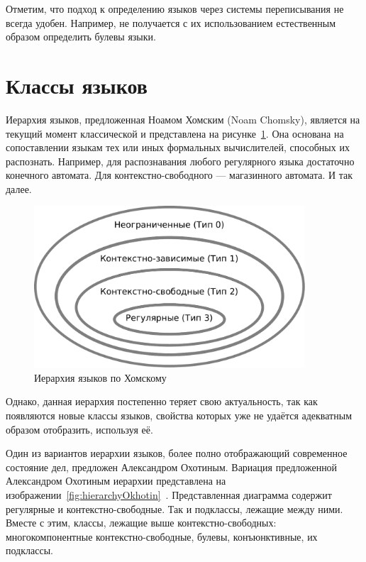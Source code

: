 Отметим, что подход к определению языков через системы переписывания не всегда удобен. Например, не получается с их использованием естественным образом определить булевы языки.


\section{Классы языков}

Иерархия языков, предложенная Ноамом Хомским (Noam Chomsky), является на текущий момент классической и представлена на рисунке~\ref{fig:Chomsky}.
Она основана на сопоставлении языкам тех или иных формальных вычислителей, способных их распознать.
Например, для распознавания любого регулярного языка достаточно конечного автомата. Для контекстно-свободного --- магазинного автомата. И так далее.


\begin{figure}
  \begin{center}
    \includegraphics[width=0.9\textwidth]{figures/Chomsky.pdf}
  \end{center}
  \caption{Иерархия языков по Хомскому}
  \label{fig:Chomsky}
\end{figure}

Однако, данная иерархия постепенно теряет свою актуальность, так как появляются новые классы языков, свойства которых уже не удаётся адекватным образом отобразить, используя её.

Один из вариантов иерархии языков, более полно отображающий современное состояние дел, предложен Александром Охотиным.
Вариация предложенной Александром Охотиным иерархии представлена на изображении~\ref{fig:hierarchyOkhotin}~.
Представленная диаграмма содержит регулярные и контекстно-свободные.
Так и подклассы, лежащие между ними.
Вместе с этим, классы, лежащие выше контекстно-свободных: многокомпонентные контекстно-свободные, булевы, конъюнктивные, их подклассы.

